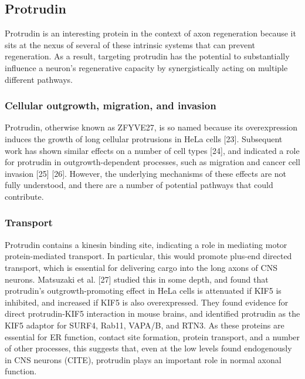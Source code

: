 \documentclass[
  12pt,
  a4paper,
]{book}
\begin{document}
\hypertarget{protrudin}{%
\subsection{Protrudin}\label{protrudin}}

Protrudin is an interesting protein in the context of axon regeneration because it sits at the nexus of several of these intrinsic systems that can prevent regeneration. As a result, targeting protrudin has the potential to substantially influence a neuron's regenerative capacity by synergistically acting on multiple different pathways.

\hypertarget{cellular-outgrowth-migration-and-invasion}{%
\subsubsection{Cellular outgrowth, migration, and invasion}\label{cellular-outgrowth-migration-and-invasion}}

Protrudin, otherwise known as ZFYVE27, is so named because its overexpression induces the growth of long cellular protrusions in HeLa cells {[}23{]}. Subsequent work has shown similar effects on a number of cell types {[}24{]}, and indicated a role for protrudin in outgrowth-dependent processes, such as migration and cancer cell invasion {[}25{]} {[}26{]}. However, the underlying mechanisms of these effects are not fully understood, and there are a number of potential pathways that could contribute.

\hypertarget{transport}{%
\subsubsection{Transport}\label{transport}}

Protrudin contains a kinesin binding site, indicating a role in mediating motor protein-mediated transport. In particular, this would promote plus-end directed transport, which is essential for delivering cargo into the long axons of CNS neurons. Matsuzaki et al. {[}27{]} studied this in some depth, and found that protrudin's outgrowth-promoting effect in HeLa cells is attenuated if KIF5 is inhibited, and increased if KIF5 is also overexpressed. They found evidence for direct protrudin-KIF5 interaction in mouse brains, and identified protrudin as the KIF5 adaptor for SURF4, Rab11, VAPA/B, and RTN3. As these proteins are essential for ER function, contact site formation, protein transport, and a number of other processes, this suggests that, even at the low levels found endogenously in CNS neurons (CITE), protrudin plays an important role in normal axonal function.
\end{document}
